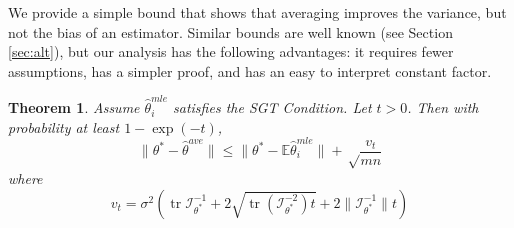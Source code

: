 \documentclass[twoside]{article}
\newtheorem{theorem}{Theorem}
\DeclareMathOperator*{\tr}{tr}
\newcommand{\E}{\mathbb{E}}
\newcommand{\w}{\theta}
\newcommand{\wowa}{\hat\w^{owa}}
\newcommand{\wave}{\hat\w^{ave}}
\newcommand{\wmle}{\hat\w^{mle}}
\newcommand{\wstar}{{\w^{*}}}
\newcommand{\I}{\mathcal I}
\newcommand{\ltwo}[1]{{\lVert {#1} \rVert}}
\begin{document}
We provide a simple bound that shows that averaging improves the variance,
but not the bias of an estimator.
Similar bounds are well known (see Section \ref{sec:alt}),
but our analysis has the following advantages:
it requires fewer assumptions, has a simpler proof, and has an easy to interpret constant factor.

\begin{theorem}
\label{thm:wave}
Assume $\wmle_i$ satisfies the SGT Condition.
Let $t>0$.
Then with probability at least $1-\exp(-t)$,
\begin{equation}
\ltwo{\wstar-\wave} \le \ltwo{\wstar-\E\wmle_i} + \sqrt\frac{v_t}{mn}
\end{equation}
where
\begin{equation}
v_t =
\sigma^2
\left(
\tr{\I^{-1}_{\wstar}}
+ 2\sqrt{\tr \left({\I^{-2}_{\wstar}}\right)t}
+ 2\ltwo{\I^{-1}_{\wstar}}t
\right)
\label{eq:vt}
\end{equation}
\end{theorem}
\end{document}
